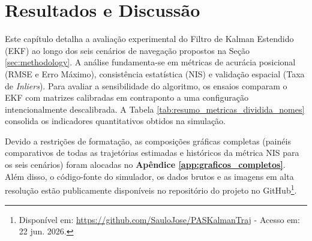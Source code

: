 
\section{Resultados e Discussão}
\label{sec:results}

Este capítulo detalha a avaliação experimental do Filtro de Kalman Estendido (EKF) ao longo dos seis cenários de navegação propostos na Seção \ref{sec:methodology}. A análise fundamenta-se em métricas de acurácia posicional (RMSE e Erro Máximo), consistência estatística (NIS) e validação espacial (Taxa de \textit{Inliers}). Para avaliar a sensibilidade do algoritmo, os ensaios comparam o EKF com matrizes calibradas em contraponto a uma configuração intencionalmente descalibrada. A Tabela \ref{tab:resumo_metricas_dividida_nomes} consolida os indicadores quantitativos obtidos na simulação.

Devido a restrições de formatação, as composições gráficas completas (painéis comparativos de todas as trajetórias estimadas e históricos da métrica NIS para os seis cenários) foram alocadas no \textbf{Apêndice \ref{app:graficos_completos}}. Além disso, o código-fonte do simulador, os dados brutos e as imagens em alta resolução estão publicamente disponíveis no repositório do projeto no GitHub\footnote{Disponível em: \url{https://github.com/SauloJose/PASKalmanTraj} - Acesso em: 22 jun. 2026.}.


